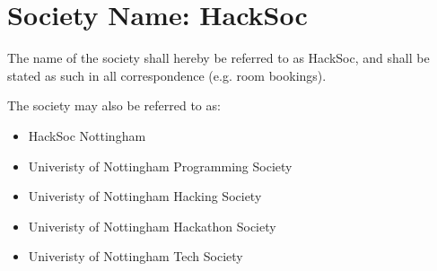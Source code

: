 \section*{Society Name: HackSoc}
\begin{clause}
  The name of the society shall hereby be referred to as HackSoc, and shall be stated as such in all correspondence (e.g. room bookings).
\end{clause}

\begin{clause}
  The society may also be referred to as:
  \begin{itemize}
    \item HackSoc Nottingham
    \item Univeristy of Nottingham Programming Society
    \item Univeristy of Nottingham Hacking Society
    \item Univeristy of Nottingham Hackathon Society
    \item Univeristy of Nottingham Tech Society
  \end{itemize}
\end{clause}
  